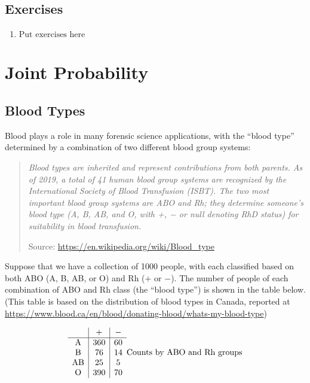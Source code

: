 \documentclass[
]{book}
\providecommand{\tightlist}{%
  \setlength{\itemsep}{0pt}\setlength{\parskip}{0pt}}
\begin{document}
\hypertarget{exercises}{%
\section{Exercises}\label{exercises}}

\begin{enumerate}
\def\labelenumi{\arabic{enumi}.}
\tightlist
\item
  \(\text{Put exercises here}\)
\end{enumerate}

\hypertarget{joint-probability}{%
\chapter{Joint Probability}\label{joint-probability}}

\hypertarget{blood-types}{%
\section{Blood Types}\label{blood-types}}

Blood plays a role in many forensic science applications, with the ``blood
type'' determined by a combination of two different blood group systems:

\begin{quote}
\emph{Blood types are inherited and represent contributions from both parents.
As of 2019, a total of 41 human blood group systems are recognized by the
International Society of Blood Transfusion (ISBT). The two most
important blood group systems are ABO and Rh; they determine someone's
blood type (A, B, AB, and O, with +, − or null denoting RhD status)
for suitability in blood transfusion.}

Source: \url{https://en.wikipedia.org/wiki/Blood_type}
\end{quote}

Suppose that we have a collection of 1000 people, with each classified based on both
ABO (A, B, AB, or O) and Rh (\(+\) or \(-\)).
The number of people of each combination of ABO and Rh class (the ``blood type'') is shown
in the table below. (This table is based on the distribution of blood types in
Canada, reported at \url{https://www.blood.ca/en/blood/donating-blood/whats-my-blood-type})

\[
\begin{array}{c|c|c}
       & + & - \\ \hline
\mathrm{A} & 360 & 60 \\ 
\mathrm{B} & 76 & 14 \\ 
\mathrm{AB} & 25 & 5 \\ 
\mathrm{O} & 390 & 70 \\ 
\end{array}\\
\mbox{Counts by ABO and Rh groups}
\]
\end{document}
